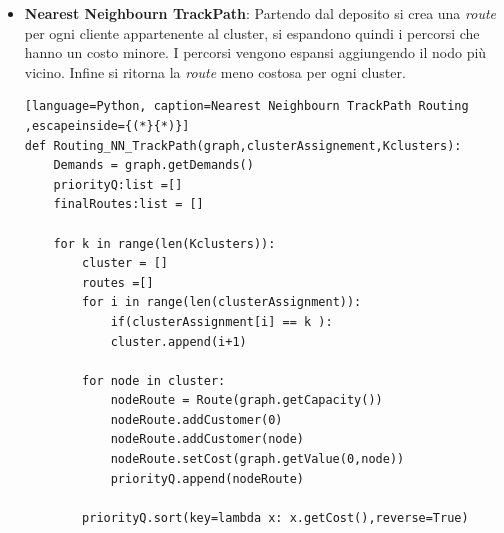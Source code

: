 \documentclass[]{article}
\begin{document}
\begin{itemize}
\begin{lstlisting}[language=Python, caption=NearestNeighbourn Routing ,escapeinside={(*}{*)}]
\end{lstlisting}
Listing 5 presenta lo pseudocodice: la firma del metodo in linea 1 richiede il grafo, l'assegnamento creato dal GAP solver, i \textit{Kcluster} selezionati dalla procedura precedente. La riga 2,3 estraggono le informazioni dal grafo, la 4 inizializza la soluzione da ritornare \textit{routes} a vuoto. Da 6 a 10 si creano i singoli cluster, scorrendo la lista \textit{clusterAssignement} e individuando a quale cluster sono stati assegnati i clienti. Per ogni cluster è creata una lista \textit{cluster}. Dentro al ciclo che scorre i cluster in 6, si inizializza la \emph{appoRoute},con capacità e deposito 12,13. Questa \emph{route} collegherà i clienti della lista  \textit{cluster} che abbiamo appena popolato. All'interno del while a riga 15, si estrae l'ultimo nodo inserito in \emph{appoRoute} e si calcolano tutte le distanze dei clienti che popolano la lista \textit{cluster} 16, 17. Si trova il più vicino al nodo estratto \textit{prevNode} 18. Se il nodo non è ancora presente nella  lista di clienti di \emph{appoRoute}, lo aggiungo e lo rimuvo dalla lista \textit{cluster} 20,21. Una volta raggiunti tutti i clienti chiudo la strada aggiungendo il deposito alal fine della lista di clienti,e aggiungo \textit{appoRoute} a \textit{routes}. Dopo aver esaurito i componenti di \textit{Kcluster}, ritorno la soluzione \textit{routes}.
\item \textbf{Nearest Neighbourn TrackPath}: Partendo dal deposito si crea una \emph{route} per ogni cliente appartenente al cluster, si espandono quindi i percorsi che hanno un costo minore. I percorsi vengono espansi aggiungendo il nodo più vicino. Infine si ritorna la \emph{route} meno costosa per ogni cluster.

\begin{lstlisting}[language=Python, caption=Nearest Neighbourn TrackPath Routing ,escapeinside={(*}{*)}]
def Routing_NN_TrackPath(graph,clusterAssignement,Kclusters):
	Demands = graph.getDemands()
	priorityQ:list =[]
	finalRoutes:list = []
	
	for k in range(len(Kclusters)):
		cluster = []
		routes =[]
		for i in range(len(clusterAssignment)):
			if(clusterAssignment[i] == k ):
			cluster.append(i+1)
	
		for node in cluster:          
			nodeRoute = Route(graph.getCapacity())
			nodeRoute.addCustomer(0)
			nodeRoute.addCustomer(node)
			nodeRoute.setCost(graph.getValue(0,node))
			priorityQ.append(nodeRoute)
		
		priorityQ.sort(key=lambda x: x.getCost(),reverse=True)
	

\end{lstlisting}
\end{itemize}
\end{document}
